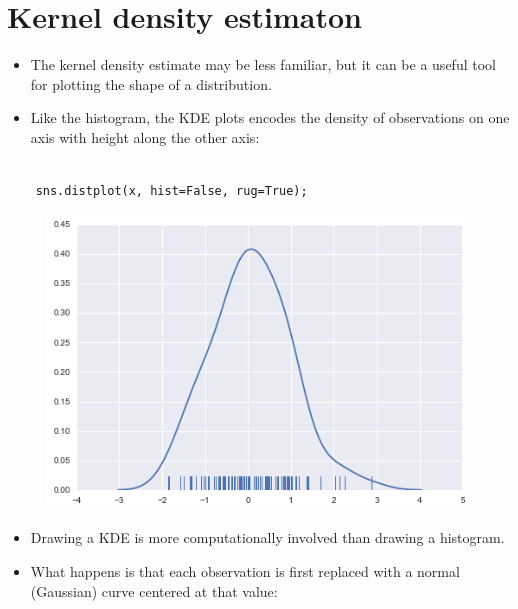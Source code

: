 \documentclass{beamer}
\begin{document}
\section{Kernel density estimaton}
\begin{frame}[fragile]
	\begin{itemize}
		\item The kernel density estimate may be less familiar, but it can be a useful tool for plotting the shape of a distribution. 
		\item Like the histogram, the KDE plots encodes the density of observations on one axis with height along the other axis:
	\end{itemize}	
	
	
	
\end{frame}
\begin{frame}[fragile]
	\large
	\begin{verbatim}
	
	sns.distplot(x, hist=False, rug=True);
	\end{verbatim}
	\begin{figure}
		\centering
		\includegraphics[width=0.7\linewidth]{images/distributions_14_0}
	\end{figure}
\end{frame}
\begin{frame}[fragile]
	\begin{itemize}
		\item Drawing a KDE is more computationally involved than drawing a histogram.
		\item What happens is that each observation is first replaced with a normal (Gaussian) curve centered at that value:
	\end{itemize}
	
	
\end{frame}
\end{document}
